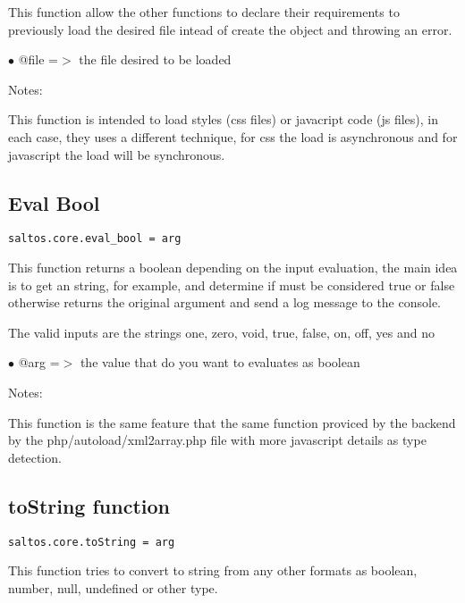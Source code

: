 \documentclass[a4paper]{book}
\begin{document}
This function allow the other functions to declare their requirements to previously load the
desired file intead of create the object and throwing an error.

\begin{compactitem}
\item[\color{myblue}$\bullet$] @file =$>$ the file desired to be loaded
\end{compactitem}

Notes:

This function is intended to load styles (css files) or javacript code (js files), in each
case, they uses a different technique, for css the load is asynchronous and for javascript
the load will be synchronous.

\hypertarget{toc496}{}
\subsection{Eval Bool}

\begin{lstlisting}
saltos.core.eval_bool = arg
\end{lstlisting}

This function returns a boolean depending on the input evaluation, the main idea
is to get an string, for example, and determine if must be considered true or false
otherwise returns the original argument and send a log message to the console.

The valid inputs are the strings one, zero, void, true, false, on, off, yes and no

\begin{compactitem}
\item[\color{myblue}$\bullet$] @arg =$>$ the value that do you want to evaluates as boolean
\end{compactitem}

Notes:

This function is the same feature that the same function proviced by the backend by the
php/autoload/xml2array.php file with more javascript details as type detection.

\hypertarget{toc497}{}
\subsection{toString function}

\begin{lstlisting}
saltos.core.toString = arg
\end{lstlisting}

This function tries to convert to string from any other formats as boolean,
number, null, undefined or other type.
\end{document}

